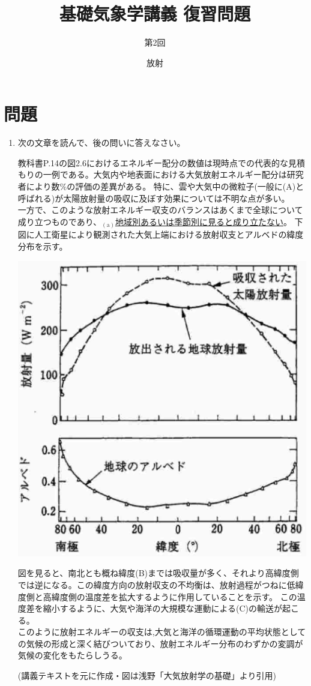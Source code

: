 \documentclass{jsarticle}
\newenvironment{problems}
{
  \renewcommand\labelenumi{\doublebox{\arabic{enumi}}}
  \begin{enumerate}
}{
  \end{enumerate}
  \renewcommand\labelenumi{\arabic{enumi}.}
}
\begin{document}
\title{基礎気象学講義 復習問題} %
\author{第2回} %
\date{放射} %
\maketitle

\section{問題}

    \begin{problems}
    \item 次の文章を読んで、後の問いに答えなさい。
        \begin{screen}
        教科書P.14の図2.6におけるエネルギー配分の数値は現時点での代表的な見積もりの一例である。大気内や地表面における大気放射エネルギー配分は研究者により数\%の評価の差異がある。
        特に、雲や大気中の微粒子(一般に(A)と呼ばれる)が太陽放射量の吸収に及ぼす効果については不明な点が多い。\\
        一方で、このような放射エネルギー収支のバランスはあくまで全球について成り立つものであり、$_{(\mathrm{a})}$\underline{地域別あるいは季節別に見ると成り立たない}。
        下図に人工衛星により観測された大気上端における放射収支とアルベドの緯度分布を示す。
        \begin{center}
        \includegraphics[width=0.5\linewidth,keepaspectratio]{AbsorbLat.eps}
        \end{center}

        図を見ると、南北とも概ね緯度(B)までは吸収量が多く、それより高緯度側では逆になる。この緯度方向の放射収支の不均衡は、放射過程がつねに低緯度側と高緯度側の温度差を拡大するように作用していることを示す。
        この温度差を縮小するように、大気や海洋の大規模な運動による(C)の輸送が起こる。\\
        このように放射エネルギーの収支は,大気と海洋の循環運動の平均状態としての気候の形成と深く結びついており、放射エネルギー分布のわずかの変調が気候の変化をもたらしうる。
        \begin{flushright}
            (講義テキストを元に作成・図は浅野「大気放射学の基礎」より引用)
        \end{flushright}
        \end{screen}


\end{problems}
\end{document}
